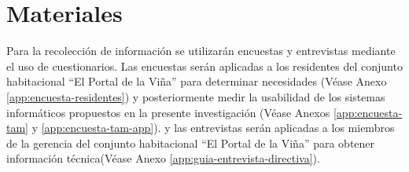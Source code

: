 \section{Materiales}
Para la recolección de información se utilizarán encuestas y entrevistas mediante el uso de cuestionarios.
Las encuestas serán aplicadas a los residentes del conjunto habitacional {\textquotedblleft}El Portal de la Viña{\textquotedblright} para determinar necesidades (Véase Anexo \ref{app:encuesta-residentes}) y posteriormente medir la usabilidad de los sistemas informáticos propuestos en la presente investigación (Véase Anexos \ref{app:encuesta-tam} y \ref{app:encuesta-tam-app}). y las entrevistas serán aplicadas a los miembros de la gerencia del conjunto habitacional {\textquotedblleft}El Portal de la Viña{\textquotedblright} para obtener información técnica(Véase Anexo \ref{app:guia-entrevista-directiva}).
